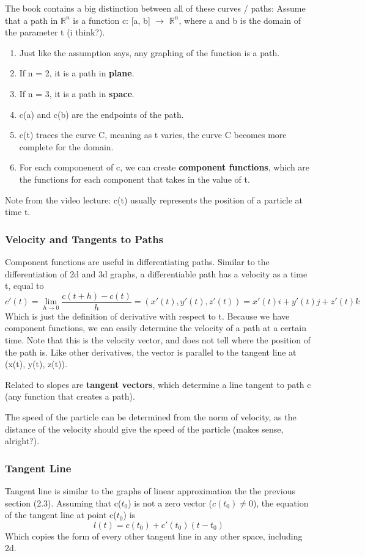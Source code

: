 \documentclass{article}
\begin{document}
The book contains a big distinction between all of these curves / paths:\newline
Assume that a path in $\mathbb{R}^n$ is a function c: [a, b] $\rightarrow$ $\mathbb{R}^n$, where a and b is the domain of the parameter t (i think?).
\begin{enumerate}
  \item Just like the assumption says, any graphing of the function is a path.
  \item If n = 2, it is a path in \textbf{plane}.
  \item If n = 3, it is a path in \textbf{space}.
  \item c(a) and c(b) are the endpoints of the path.
  \item c(t) traces the curve C, meaning as t varies, the curve C becomes more complete for the domain.
  \item For each componenent of c, we can create \textbf{component functions}, which are the functions for each component that takes in the value of t.
\end{enumerate}

Note from the video lecture: c(t) usually represents the position of a particle at time t.

\subsubsection{Velocity and Tangents to Paths}
Component functions are useful in differentiating paths. Similar to the differentiation of 2d and 3d graphs, a differentiable path has a velocity as a time t, equal to
\[
  c'(t) = \lim_{h \rightarrow 0} \frac{c(t + h) - c(t)}{h} = (x'(t), y'(t), z'(t)) = x'(t)i +  y'(t)j +  z'(t)k
\]
Which is just the definition of derivative with respect to t. Because we have component functions, we can easily determine the velocity of a path at a certain time. Note that this is the velocity vector, and does not tell where the position of the path is. Like other derivatives, the vector is parallel to the tangent line at (x(t), y(t), z(t)).

Related to slopes are \textbf{tangent vectors}, which determine a line tangent to path c (any function that creates a path). 

The speed of the particle can be determined from the norm of velocity, as the distance of the velocity should give the speed of the particle (makes sense, alright?).

\subsubsection{Tangent Line}
Tangent line is similar to the graphs of linear approximation the the previous section (2.3). Assuming that c($t_0$) is not a zero vector ($c(t_0) \neq 0$), the equation of the tangent line at point c($t_0$) is 
\[
  l(t) = c(t_0) + c'(t_0)(t - t_0)
\]
Which copies the form of every other tangent line in any other space, including 2d.
\end{document}

